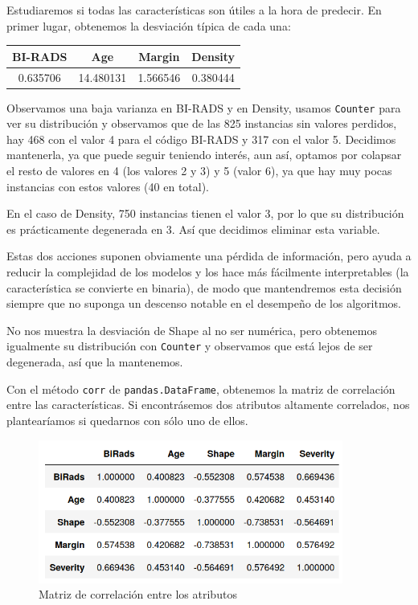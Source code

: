 \documentclass{article}
\begin{document}
Estudiaremos si todas las características son útiles a la hora de
predecir. En primer lugar, obtenemos la desviación típica de cada una:

\begin{table}[H]
  \centering
  \begin{tabular}{cccc}
    BI-RADS &  Age & Margin & Density \\ \hline
	0.635706 & 14.480131 & 1.566546 & 0.380444
  \end{tabular}
\end{table}
Observamos una baja varianza en BI-RADS y en Density, usamos
\texttt{Counter} para ver su distribución y observamos que de las 825
instancias sin valores perdidos, hay 468 con el valor 4 para el código
BI-RADS y 317 con el valor 5. Decidimos mantenerla, ya que puede
seguir teniendo interés, aun así, optamos por colapsar el resto de
valores en 4 (los valores 2 y 3) y 5 (valor 6), ya que hay muy pocas
instancias con estos valores (40 en total). 

En el caso de Density, 750 instancias tienen el valor 3, por lo que su
distribución es prácticamente degenerada en 3. Así que decidimos
eliminar esta variable.

Estas dos acciones suponen obviamente una pérdida de información, pero
ayuda a reducir la complejidad de los modelos y los hace más
fácilmente interpretables (la característica se convierte en binaria),
de modo que mantendremos esta decisión siempre que no suponga un
descenso notable en el desempeño de los algoritmos.

No nos muestra la desviación de Shape al no ser numérica, pero
obtenemos igualmente su distribución con \texttt{Counter} y observamos
que está lejos de ser degenerada, así que la mantenemos.

Con el método \texttt{corr} de \texttt{pandas.DataFrame}, obtenemos la
matriz de correlación entre las características. Si encontrásemos dos
atributos altamente correlados, nos plantearíamos si quedarnos con
sólo uno de ellos.

\begin{figure}[H]
  \centering
  \includegraphics[width=100mm]{figures/corr}
  \caption{Matriz de correlación entre los atributos}
  \label{fig:corr}
\end{figure}
\end{document}
